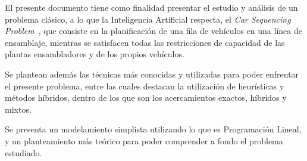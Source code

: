 El presente documento tiene como finalidad presentar el estudio y análisis de un problema clásico, a lo que la Inteligencia Artificial respecta,
el \emph{Car Sequencing Problem}~\cite{parello}, que consiste en la planificación de una fila de vehículos en una línea de ensamblaje, 
mientras se satisfacen todas las restricciones de capacidad de las plantas ensambladores y de los propios vehículos.

Se plantean además las técnicas más conocidas y utilizadas para poder enfrentar el presente problema, entre las cuales destacan la utilización
de heurísticas y métodos híbridos, dentro de los que son los acercamientos exactos, híbridos y mixtos.

Se presenta un modelamiento simplista utilizando lo que es Programación Lineal, y un planteamiento más teórico para poder comprender a fondo
el problema estudiado.



